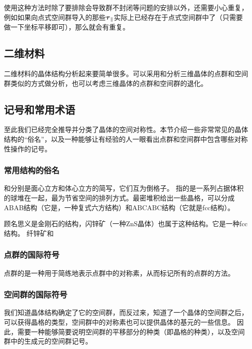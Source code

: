 使用这种方法时除了要排除会导致群不封闭等问题的安排以外，还需要小心重复，例如如果向点式空间群导入的那些$\vb*{\tau}_\parallel$实际上已经存在于点式空间群中了（只需要做一下坐标平移即可），那么就会有重复。

\subsection{二维材料}

二维材料的晶体结构分析起来要简单很多。可以采用和分析三维晶体的点群和空间群类似的方式做分析，也可以考虑三维晶体的点群和空间群的退化。

\subsection{记号和常用术语}

至此我们已经完全推导并分类了晶体的空间对称性。本节介绍一些非常常见的晶体结构的“俗名”，以及一种能够让有经验的人一眼看出点群和空间群中包含哪些对称性操作的记号。

\subsubsection{常用结构的俗名} 

和分别是面心立方和体心立方的简写，它们互为倒格子。
指的是一系列占据体积的球堆在一起，最为节省空间的排列方式。最密堆积给出一些晶格，可以分成ABAB结构（它是，一种复式六方结构）和ABCABC结构（它就是fcc结构）。

顾名思义是金刚石的结构，闪锌矿（一种ZnS晶体）也属于这种结构。它是一种fcc结构。
纤锌矿和

\subsubsection{点群的国际符号} 

点群的是一种用于简练地表示点群中的对称素，从而标记所有的点群的方法。


\subsubsection{空间群的国际符号} 

我们知道晶体结构确定了它的空间群，而反过来，知道了一个晶体的空间群之后，可以获得晶格的类型，空间群中的对称素也可以提供晶体的基元的一些信息。
因此，需要一种能够简要说明空间群的平移部分的种类（即晶格的种类），以及空间群中的生成元的空间群记号。

